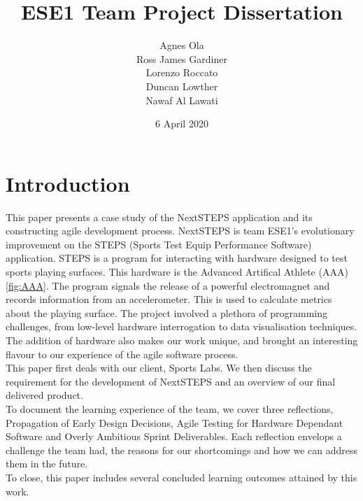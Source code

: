 \documentclass{l3proj}
\begin{document}
\title{ESE1 Team Project Dissertation}

\author{Agnes Ola \\
        Ross James Gardiner \\
        Lorenzo Roccato \\
        Duncan Lowther \\
        Nawaf Al Lawati}

\date{6 April 2020}

\maketitle

\begin{abstract}


\end{abstract}

\educationalconsent

\newpage
\section{Introduction}

This paper presents a case study of the NextSTEPS application and its constructing agile development process. NextSTEPS is team ESE1's evolutionary improvement on the STEPS (Sports Test Equip Performance Software) application. STEPS is a program for interacting with hardware designed to test sports playing surfaces. This hardware is the Advanced Artifical Athlete (AAA) \ref{fig:AAA}. The program signals the release of a powerful electromagnet and records information from an accelerometer. This is used to calculate metrics about the playing surface. The project involved a plethora of programming challenges, from low-level hardware interrogation to data visualisation techniques. The addition of hardware also makes our work unique, and brought an interesting flavour to our experience of the agile software process. 
\\
This paper first deals with our client, Sports Labs. We then discuss the requirement for the development of NextSTEPS and an overview of our final delivered product. 
\\
To document the learning experience of the team, we cover three reflections, Propagation of Early Design Decisions, Agile Testing for Hardware Dependant Software and Overly Ambitious Sprint Deliverables. Each reflection envelops a challenge the team had, the reasons for our shortcomings and how we can address them in the future. 
\\
To close, this paper includes several concluded learning outcomes attained by this work. 
\end{document}
